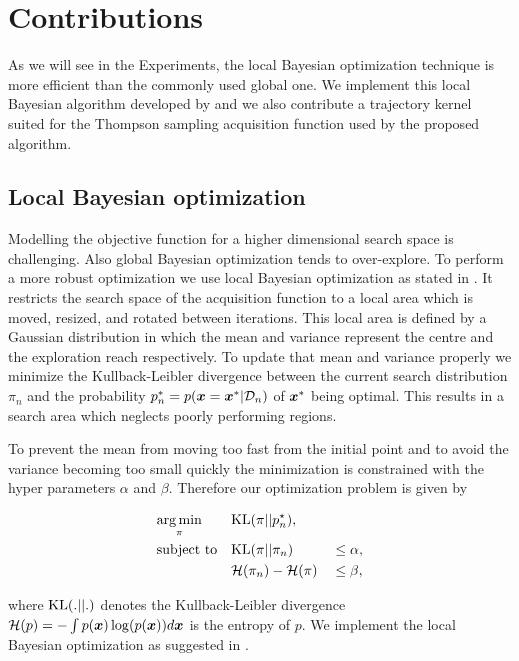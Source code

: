 \chapter{Contributions}
\label{chap:contributions}

As we will see in the Experiments, the local Bayesian optimization technique is more efficient than the commonly used global one. We implement this local Bayesian algorithm developed by \cite{akrour2017local} and we also contribute a trajectory kernel suited for the Thompson sampling acquisition function used by the proposed algorithm.

\section{Local Bayesian optimization}
\label{sec:localBO}
Modelling the objective function for a higher dimensional search space is challenging. Also global Bayesian optimization tends to over-explore. To perform a more robust optimization we use local Bayesian optimization as stated in \cite{akrour2017local}. It restricts the search space of the acquisition function to a local area which is moved, resized, and rotated between iterations. This local area is defined by a Gaussian distribution in which the mean and variance represent the centre and the exploration reach respectively. To update that mean and variance properly we minimize the Kullback-Leibler divergence between the current search distribution $\pi_n$ and the probability $p_n^* = p({\boldsymbol{x}}={\boldsymbol{x}}^*|\mathcal{D}_n)$ of ${\boldsymbol{x}}^*$ being optimal. This results in a search area which neglects poorly performing regions.

To prevent the mean from moving too fast from the initial point and to avoid the variance becoming too small quickly the minimization is constrained with the hyper parameters $\alpha$ and $\beta$. Therefore our optimization problem is given by

\begin{align}
    & \underset{\pi}{\arg\min} & & \mathrm{KL}(\pi||p_n^\star),& &\notag\\
    & \text{subject to}
    & & \mathrm{KL}(\pi||\pi_n) & &\leq \alpha,\label{eq:kl:our}\\
    & & &{\cal H}(\pi_n) - {\cal H}(\pi) & &\leq \beta,\label{eq:entropy:our}
\end{align}

where $\mathrm{KL}(.||.)$ denotes the Kullback-Leibler divergence $\mathcal{H}(p) = -\int p({\boldsymbol{x}})\log(p({\boldsymbol{x}})) d{\boldsymbol{x}}$ is the entropy of $p$. We implement the local Bayesian optimization as suggested in \cite{akrour2017local}.

